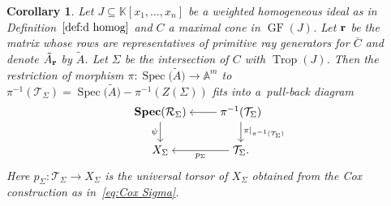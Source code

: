 \documentclass[10pt,a4paper]{amsart}
\newcommand{\thlabel}[1]{\label{#1}}
\newcommand{\thref}[1]{\ref{#1}}
\newtheorem{Corollary}[Theorem]{Corollary}
\numberwithin{equation}{section}
\DeclareMathOperator{\GF}{GF}
\DeclareMathOperator{\trop}{Trop}
\begin{document}
\begin{Corollary}\thlabel{thm:KM vs grobner}
Let $J\subseteq\mathbb K[{x_1,\dots,x_n}]$ be a weighted homogeneous ideal as in Definition~$\ref{def:d homog}$ and $C$ a maximal cone in $\GF(J)$.
Let ${\bf r}$ be the matrix whose rows are representatives of primitive ray generators for $\overline C$ %
and denote $\tilde A_{\bf r}$ by $\tilde A$.
Let $\Sigma$ be the intersection of $C$ with $\trop(J)$.
Then the restriction of morphism $\pi\colon \operatorname{Spec}\big(\tilde A\big)\to \mathbb A^m$ to $\pi^{-1}(\mathcal T_\Sigma)=\operatorname{Spec}\big(\tilde A\big)-\pi^{-1}(Z(\Sigma))$ fits into a~pull-back diagram
 \begin{equation*}%
 \begin{tikzcd}[ampersand replacement=\&,cramped]
 \mathbf{Spec}(\mathcal R_\Sigma)\ar[d,"\psi"'] \&
 \pi^{-1}(\mathcal T_\Sigma)\ar[d,"\pi\vert_{\pi^{-1}(\mathcal T_\Sigma)}"] \ar[l]\\
 X_{\Sigma}\& \mathcal T_\Sigma. \ar[l,"p_\Sigma"]
 \end{tikzcd}
 \end{equation*}
Here $p_\Sigma\colon \mathcal T_\Sigma\to X_\Sigma$ is the universal torsor of $X_\Sigma$ obtained from the Cox construction as in~\eqref{eq:Cox Sigma}.
\end{Corollary}
\end{document}
